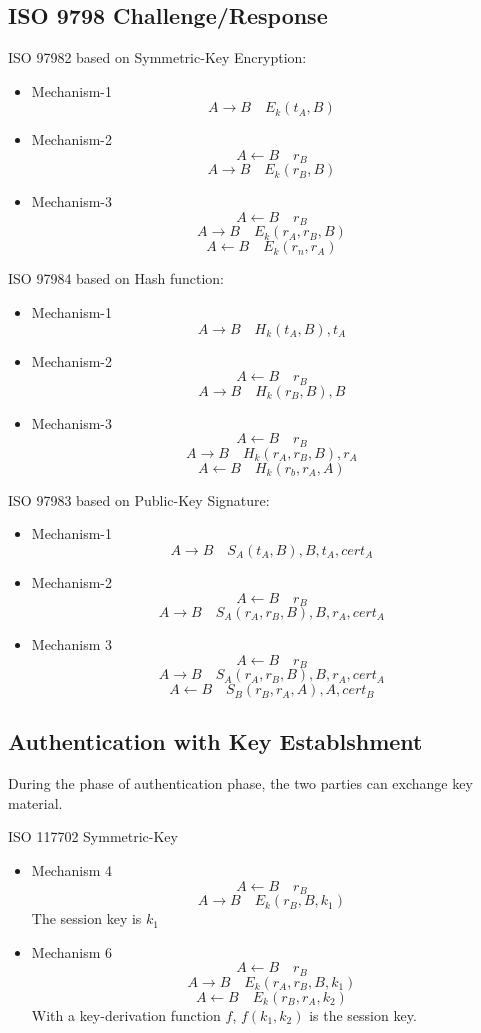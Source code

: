 \subsection{ISO 9798 Challenge/Response}
ISO 9798\text{-}2 based on Symmetric-Key Encryption:
\begin{itemize}
    \item Mechanism-1
        $$ A  \rightarrow B \quad E_k(t_A,B) $$
    \item Mechanism-2
        $$ A  \leftarrow  B \quad r_B $$
        $$ A  \rightarrow B \quad E_k(r_B,B) $$
    \item Mechanism-3
        $$ A  \leftarrow B \quad r_B $$
        $$ A  \rightarrow B \quad E_k(r_A,r_B,B) $$
        $$ A  \leftarrow  B \quad E_k(r_n,r_A) $$
\end{itemize}
ISO 9798\text{-}4 based on Hash function:
\begin{itemize}
    \item Mechanism-1
        $$ A \rightarrow B \quad H_k(t_A,B),t_A $$
    \item Mechanism-2
        $$ A \leftarrow B \quad r_B $$
        $$ A \rightarrow B \quad H_k(r_B,B),B $$
    \item Mechanism-3
        $$ A \leftarrow B \quad r_B $$
        $$ A \rightarrow B \quad H_k(r_A,r_B,B),r_A $$
        $$ A \leftarrow B \quad H_k(r_b,r_A,A) $$
\end{itemize}
ISO 9798\text{-}3 based on Public-Key Signature:
\begin{itemize}
    \item Mechanism-1
        $$ A \rightarrow B \quad S_A(t_A,B),B,t_A,cert_A $$
    \item Mechanism-2
        $$ A \leftarrow B \quad r_B$$
        $$ A \rightarrow B \quad S_A(r_A,r_B,B),B,r_A,cert_A $$
    \item Mechanism 3
        $$ A \leftarrow B \quad r_B $$
        $$ A \rightarrow B \quad S_A(r_A,r_B,B),B,r_A,cert_A $$
        $$ A \leftarrow B \quad S_B(r_B,r_A,A),A,cert_B $$
\end{itemize}
\subsection{Authentication with Key Establshment}
During the phase of authentication phase, the two parties can exchange key
material.

ISO 11770\text{-}2 Symmetric-Key
\begin{itemize}
    \item Mechanism 4
        $$ A \leftarrow B \quad r_B $$
        $$ A \rightarrow B \quad E_k(r_B,B,k_1) $$
        The session key is $k_1$

    \item Mechanism 6
        $$ A \leftarrow B \quad r_B $$
        $$ A \rightarrow B \quad E_k(r_A,r_B,B,k_1) $$
        $$ A \leftarrow B \quad E_k(r_B,r_A,k_2) $$
        With a key-derivation function $f$, $f(k_1,k_2)$ is the session key.
\end{itemize}

